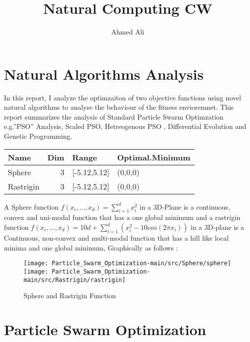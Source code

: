 \documentclass[
]{article}
\title{Natural Computing CW}
\author{Ahmed Ali}
\date{}
\begin{document}
\maketitle

\newpage

\hypertarget{natural-algorithms-analysis}{%
\section{Natural Algorithms
Analysis}\label{natural-algorithms-analysis}}

In this report, I analyze the optimzaiton of two objective functions
using novel natural algorithms to analyse the behaviour of the fitness
envioremnet. This report summarizes the analysis of Standard Particle
Swarm Optimzation e.g.''PSO'' Analysis, Scaled PSO, Hetreogenous PSO ,
Differential Evolution and Genetic Programming.

\begin{longtable}[]{@{}lrll@{}}
\toprule
Name & Dim & Range & Optimal.Minimum \\
\midrule
\endhead
Sphere & 3 & {[}-5.12,5.12{]} & (0,0,0) \\
Rastrigin & 3 & {[}-5.12,5.12{]} & (0,0,0) \\
\bottomrule
\end{longtable}

A Sphere function \(f(x_i,...,x_d)=\sum_{i=1}^d x_i^2\) in a 3D-Plane is
a continuous, convex and uni-modal function that has a one global
minimum and a rastrigin function
\(f(x_i,...,x_d) = 10d + \sum_{i=1}^d(x_i^2-10cos(2\pi x_i))\) in a
3D-plane is a Continuous, non-convex and multi-modal function that has a
hill like local minima and one global minimum, Graphically as follows :

\begin{figure}[H]

{\centering \texttt{[image: Particle\_Swarm\_Optimization-main/src/Sphere/sphere]} \texttt{[image: Particle\_Swarm\_Optimization-main/src/Rastrigin/rastrigin]} 

}

\caption{Sphere and Rastrigin Function}\label{fig:unnamed-chunk-2}
\end{figure}

\newpage

\hypertarget{particle-swarm-optimization}{%
\section{Particle Swarm
Optimization}\label{particle-swarm-optimization}}
\end{document}
